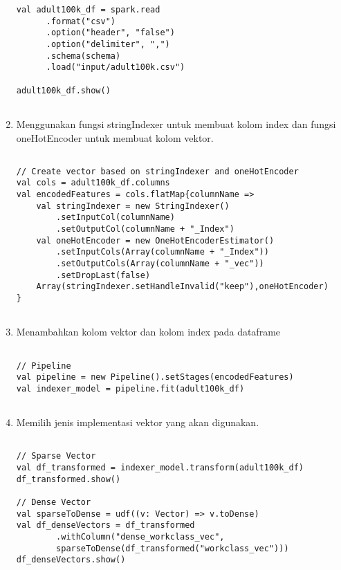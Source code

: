 \begin{enumerate}
\begin{lstlisting}[basicstyle=\ttfamily, frame=single,
	columns=fullflexible, keepspaces=true, breaklines=true, label=ls_kepatuhan_1_1_1_logo_sharif_judge, caption=Main method]
val adult100k_df = spark.read
      .format("csv")
      .option("header", "false")
      .option("delimiter", ",")
      .schema(schema)
      .load("input/adult100k.csv")

adult100k_df.show()	
	
\end{lstlisting}

\item Menggunakan fungsi stringIndexer untuk membuat kolom index dan fungsi oneHotEncoder untuk membuat kolom vektor.
\begin{lstlisting}[basicstyle=\ttfamily, frame=single,
	columns=fullflexible, keepspaces=true, breaklines=true, label=ls_kepatuhan_1_1_1_logo_sharif_judge, caption=Main method]

// Create vector based on stringIndexer and oneHotEncoder
val cols = adult100k_df.columns
val encodedFeatures = cols.flatMap{columnName =>
	val stringIndexer = new StringIndexer()
		.setInputCol(columnName)
		.setOutputCol(columnName + "_Index")
	val oneHotEncoder = new OneHotEncoderEstimator()
		.setInputCols(Array(columnName + "_Index"))
		.setOutputCols(Array(columnName + "_vec"))
		.setDropLast(false)
	Array(stringIndexer.setHandleInvalid("keep"),oneHotEncoder)
}	
	
\end{lstlisting}

\item Menambahkan kolom vektor dan kolom index pada dataframe
\begin{lstlisting}[basicstyle=\ttfamily, frame=single,
	columns=fullflexible, keepspaces=true, breaklines=true, label=ls_kepatuhan_1_1_1_logo_sharif_judge, caption=Main method]
	
// Pipeline
val pipeline = new Pipeline().setStages(encodedFeatures)
val indexer_model = pipeline.fit(adult100k_df)
	
\end{lstlisting}

\item Memilih jenis implementasi vektor yang akan digunakan.
\begin{lstlisting}[basicstyle=\ttfamily, frame=single,
	columns=fullflexible, keepspaces=true, breaklines=true, label=ls_kepatuhan_1_1_1_logo_sharif_judge, caption=Main method]
	
// Sparse Vector
val df_transformed = indexer_model.transform(adult100k_df)
df_transformed.show()

// Dense Vector
val sparseToDense = udf((v: Vector) => v.toDense)
val df_denseVectors = df_transformed
		.withColumn("dense_workclass_vec",
		sparseToDense(df_transformed("workclass_vec")))
df_denseVectors.show()	
	

\end{lstlisting}
\end{enumerate}

